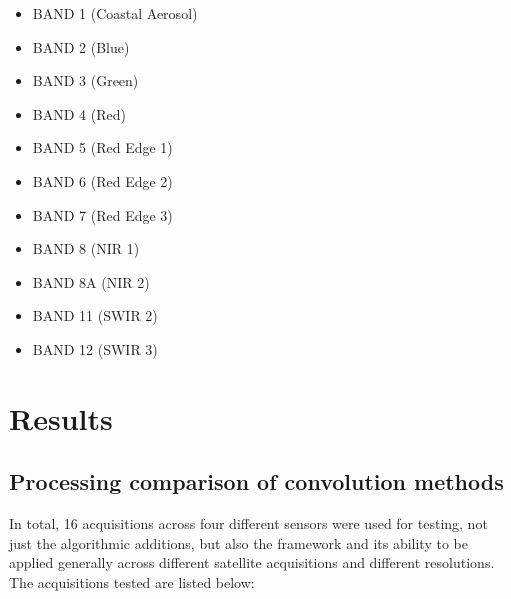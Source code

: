 \documentclass[a4paper]{article}
\begin{document}
\begin{itemize}
\begin{itemize}
          \item \footnotesize{BAND 1 (Coastal Aerosol)}
          \item \footnotesize{BAND 2 (Blue)}
          \item \footnotesize{BAND 3 (Green)}
          \item \footnotesize{BAND 4 (Red)}
          \item \footnotesize{BAND 5 (Red Edge 1)}
          \item \footnotesize{BAND 6 (Red Edge 2)}
          \item \footnotesize{BAND 7 (Red Edge 3)}
          \item \footnotesize{BAND 8 (NIR 1)}
          \item \footnotesize{BAND 8A (NIR 2)}
          \item \footnotesize{BAND 11 (SWIR 2)}
          \item \footnotesize{BAND 12 (SWIR 3)}
        \end{itemize}
    \end{itemize}

    \section{Results}

    \subsection{Processing comparison of convolution methods}

    \begin{flushleft}
      In total, 16 acquisitions across four different sensors were used for testing, not just the algorithmic additions, but also the framework and its ability to be applied generally across different satellite acquisitions and different resolutions. The acquisitions tested are listed below:
    \end{flushleft}
\end{document}
